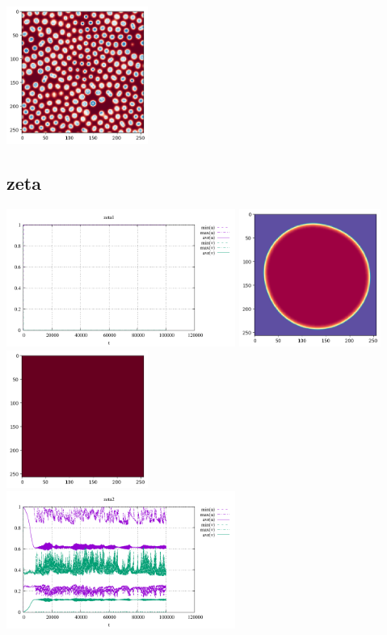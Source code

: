 \begin{center}
\includegraphics[height=4.5cm]{python_codes/fieldstone_171/results/epsilon2_solution_final_v.png}
\end{center}

\subsection*{zeta}
\begin{center}
\includegraphics[height=4.5cm]{python_codes/fieldstone_171/results/zeta1_stats}
\includegraphics[height=4.5cm]{python_codes/fieldstone_171/results/zeta1_solution_final_u.png}
\includegraphics[height=4.5cm]{python_codes/fieldstone_171/results/zeta1_solution_final_v.png}\\
\includegraphics[height=4.5cm]{python_codes/fieldstone_171/results/zeta2_stats}

\end{center}
